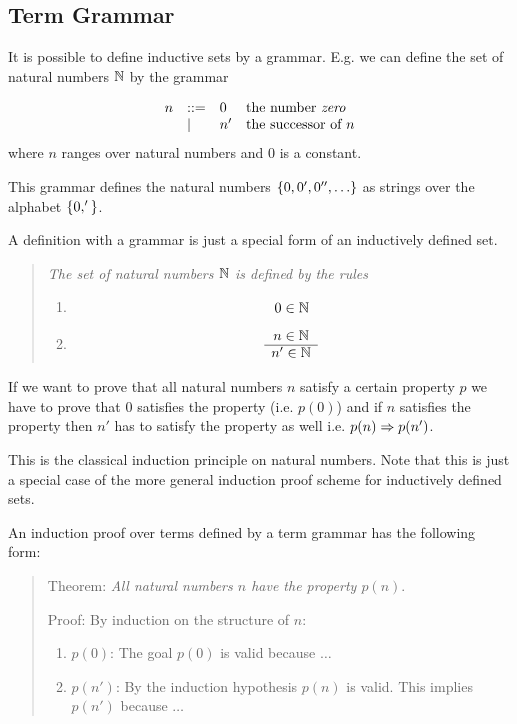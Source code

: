 \subsection{Term Grammar}

It is possible to define inductive sets by a grammar. E.g. we can define the set
of natural numbers ${\mathbb{N}}$ by the grammar


$$
\begin{array}{lllll}
    n
    &::= & 0 & \text{the number \emph{zero}}
    \\
    &\mid & n' & \text{the successor of $n$}
\end{array}
$$
where $n$ ranges over natural numbers and $0$ is a constant.

This grammar defines the natural numbers ${\{0, 0', 0'', \ldots\}}$ as strings
over the alphabet ${\{0, '\}}$.

A definition with a grammar is just a special form of an inductively defined
set.

\begin{quote}
    \emph{The set of natural numbers ${\mathbb{N}}$ is defined by the rules}
    \begin{enumerate}
    \item $$ 0 \in {\mathbb{N}} $$

    \item
        $$
        \begin{array}{c} 
            n \in {\mathbb{N}}
         \\ \hline 
            n' \in {\mathbb{N}}
        \end{array}
        $$
    \end{enumerate}
\end{quote}


If we want to prove that all natural numbers $n$ satisfy a certain property $p$
we have to prove that $0$ satisfies the property (i.e. $p(0)$) and if $n$
satisfies the property then $n'$ has to satisfy the property as well i.e. $p(n)
\Rightarrow p(n')$.

This is the classical induction principle on natural numbers. Note that this is
just a special case of the more general induction proof scheme for inductively
defined sets.

An induction proof over terms defined by a term grammar has the following form:

\begin{quote}
    Theorem: \emph{All natural numbers $n$ have the property $p(n)$}.

    Proof: By induction on the structure of $n$:
    \begin{enumerate}

    \item $p(0)$: The goal $p(0)$ is valid because $\ldots$

    \item $p(n')$: By the induction hypothesis $p(n)$ is valid. This implies
    $p(n')$ because $\ldots$

    \end{enumerate}
\end{quote}

